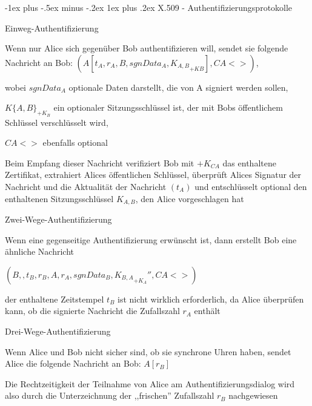 \documentclass[a4paper]{article}
\makeatletter
\renewcommand{\subsubsection}{\@startsection{subsubsection}{3}{0mm}%
 {-1ex plus -.5ex minus -.2ex}%
 {1ex plus .2ex}%
 {\normalfont\small\bfseries}}
\makeatother
\begin{document}
\begin{multicols}{3}
      \subsubsection{X.509 - Authentifizierungsprotokolle}
      \begin{itemize*}
            \item Einweg-Authentifizierung
            \begin{itemize*}
                  \item Wenn nur Alice sich gegenüber Bob authentifizieren will, sendet sie folgende Nachricht an Bob: $(A[t_A, r_A, B, sgnData_A, {K_{A,B}}_{+KB}], CA<>)$,
                  \item wobei $sgnData_A$ optionale Daten darstellt, die von A signiert werden sollen,
                  \item $K\{A,B\}_{+K_B}$ ein optionaler Sitzungsschlüssel ist, der mit Bobs öffentlichem Schlüssel verschlüsselt wird,
                  \item $CA<>$ ebenfalls optional
                  \item Beim Empfang dieser Nachricht verifiziert Bob mit $+K_{CA}$ das enthaltene Zertifikat, extrahiert Alices öffentlichen Schlüssel, überprüft Alices Signatur der Nachricht und die Aktualität der Nachricht $(t_A)$ und entschlüsselt optional den enthaltenen Sitzungsschlüssel $K_{A,B}$, den Alice vorgeschlagen hat
            \end{itemize*}
            \item Zwei-Wege-Authentifizierung
            \begin{itemize*}
                  \item Wenn eine gegenseitige Authentifizierung erwünscht ist, dann erstellt Bob eine ähnliche Nachricht
                  \item $(B,,t_B, r_B, A, r_A, sgnData_B,{K_{B,A}}_{+K_A}'', CA<>)$
                  \item der enthaltene Zeitstempel $t_B$ ist nicht wirklich erforderlich, da Alice überprüfen kann, ob die signierte Nachricht die Zufallszahl $r_A$ enthält
            \end{itemize*}
            \item Drei-Wege-Authentifizierung
            \begin{itemize*}
                  \item Wenn Alice und Bob nicht sicher sind, ob sie synchrone Uhren haben, sendet Alice die folgende Nachricht an Bob: $A[r_B]$
                  \item Die Rechtzeitigkeit der Teilnahme von Alice am Authentifizierungsdialog wird also durch die Unterzeichnung der ,,frischen'' Zufallszahl $r_B$ nachgewiesen

\end{itemize*}
\end{itemize*}
\end{multicols}
\end{document}
